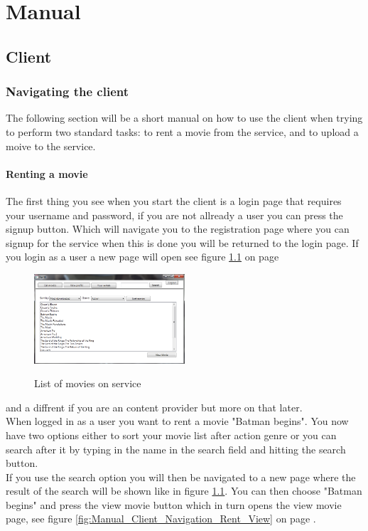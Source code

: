 \chapter{Manual}
\label{Manual}

\section{Client}
\label{Manual_Client}

\subsection{Navigating the client}
\label{Manual_Client_Navigation}
The following section will be a short manual on how to use the client when trying to perform two standard tasks: to rent a movie from the service, and to upload a moive to the service.

\subsubsection{Renting a movie}
\label{Manual_Client_Navigation_Rent}
The first thing you see when you start the client is a login page that requires your username and password, if you are not allready a user you can press the signup button. Which will navigate you to the registration page where you can signup for the service when this is done you will be returned to the login page. If you login as a user a new page will open see figure \ref{fig:Manual_Client_Navigation_Rent_List} on page \pageref{fig:Manual_Client_Navigation_Rent_List}

\begin{figure}[h!] 
  \centering
 \includegraphics[width=0.5\textwidth]{Parts/Images/Manual/Listmovies}
\label{fig:Manual_Client_Navigation_Rent_List}
\caption{List of movies on service}
\end{figure}
 
and a diffrent if you are an content provider but more on that later.
\\When logged in as a user you want to rent a movie "Batman begins". You now have two options either to sort your movie list after action genre or you can search after it by typing in the name in the search field and hitting the search button.
\\If you use the search option you will then be navigated to a new page where the result of the search will be shown like in figure \ref{fig:Manual_Client_Navigation_Rent_List}. You can then choose "Batman begins" and press the view movie button which in turn opens the view movie page, see figure \ref{fig:Manual_Client_Navigation_Rent_View} on page \pageref{fig:Manual_Client_Navigation_Rent_View}.


